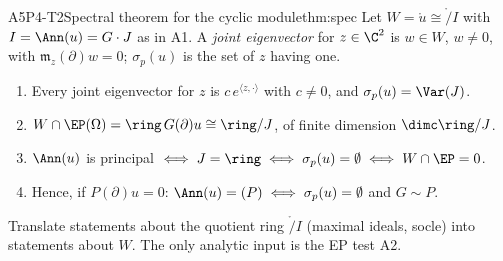 \begin{dimcard}{A5}{P4-T2}{Spectral theorem for the cyclic module}{\proved}{thm:spec}
Let $W=\ring u\cong\ring/I$ with $I=\Ann(u)=G\cdot J$ as in A1. A \emph{joint eigenvector} for $z\in\C^2$ is $w\in W$, $w\ne0$, with $\mathfrak m_z(\partial)w=0$; $\sigma_p(u)$ is the set of $z$ having one.
\begin{enumerate}[label=(\roman*)]
\item Every joint eigenvector for $z$ is $c\,e^{\langle z,\cdot\rangle}$ with $c\ne0$, and $\sigma_p(u)=\Var(J)$.
\item $W\cap\EP(\Omega)=\ring\,G(\partial)u\cong\ring/J$, of finite dimension $\dimc\ring/J$.
\item $\Ann(u)$ is principal $\iff J=\ring\iff\sigma_p(u)=\emptyset\iff W\cap\EP=0$.
\item Hence, if $P(\partial)u=0$: $\Ann(u)=(P)\iff\sigma_p(u)=\emptyset$ and $G\sim P$.
\end{enumerate}
\end{dimcard}

\begin{proofidea}
Translate statements about the quotient ring $\ring/I$ (maximal ideals, socle) into statements about $W$. The only analytic input is the EP test A2.
\end{proofidea}

